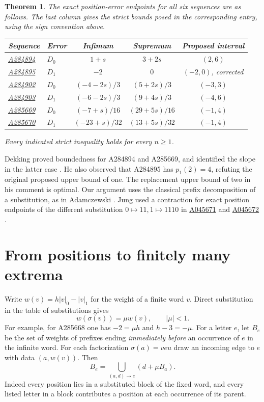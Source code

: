 \documentclass[11pt]{article}
\newtheorem{theorem}{Theorem}
\newcommand{\oeis}[1]{\href{https://oeis.org/#1}{\textup{#1}}}
\begin{document}
\begin{theorem}\label{thm:main}
The exact position-error endpoints for all six sequences are as follows.
The last column gives the strict bounds posed in the corresponding entry,
using the sign convention above.
\begin{center}
\begin{tabular}{@{}llccc@{}}
\toprule
Sequence & Error & Infimum & Supremum & Proposed interval\\
\midrule
\oeis{A284894} & $D_0$ & $1+s$ & $3+2s$ & $(2,6)$\\
\oeis{A284895} & $D_1$ & $-2$ & $0$ & $(-2,0)$, corrected\\[2pt]
\oeis{A284902} & $D_0$ & $(-4-2s)/3$ & $(5+2s)/3$ & $(-3,3)$\\
\oeis{A284903} & $D_1$ & $(-6-2s)/3$ & $(9+4s)/3$ & $(-4,6)$\\[2pt]
\oeis{A285669} & $D_0$ & $(-7+s)/16$ & $(29+5s)/16$ & $(-1,4)$\\
\oeis{A285670} & $D_1$ & $(-23+s)/32$ & $(13+5s)/32$ & $(-1,4)$\\
\bottomrule
\end{tabular}
\end{center}
Every indicated strict inequality holds for every $n\ge1$.
\end{theorem}

Dekking proved boundedness for A284894 and A285669, and identified the
slope in the latter case \cite{oeis}. He also observed that A284895 has
$p_1(2)=4$, refuting the original proposed upper bound of one. The
replacement upper bound of two in his comment is optimal. Our argument
uses the classical prefix decomposition of a substitution, as in
Adamczewski \cite{adam}. Jung used a contraction for exact position
endpoints of the different substitution $0\mapsto11,1\mapsto1110$ in
\oeis{A045671} and \oeis{A045672} \cite{jung}.

\section{From positions to finitely many extrema}
Write $w(v)=h|v|_0-|v|_1$ for the weight of a finite word $v$. Direct
substitution in the table of substitutions gives
\begin{equation}
 w(\sigma(v))=\mu w(v),\qquad |\mu|<1.
 \label{eq:scale}
\end{equation}
For example, for A285668 one has $-2=\mu h$ and $h-3=-\mu$. For a letter
$e$, let $B_e$ be the set of weights of prefixes ending \emph{immediately
before} an occurrence of $e$ in the infinite word. For each factorization
$\sigma(a)=v e u$ draw an incoming edge to $e$ with data $(a,w(v))$.
Then
\begin{equation}
 B_e=\bigcup_{(a,d)\to e}(d+\mu B_a).
 \label{eq:sets}
\end{equation}
Indeed every position lies in a substituted block of the fixed word, and
every listed letter in a block contributes a position at each occurrence of
its parent.
\end{document}
